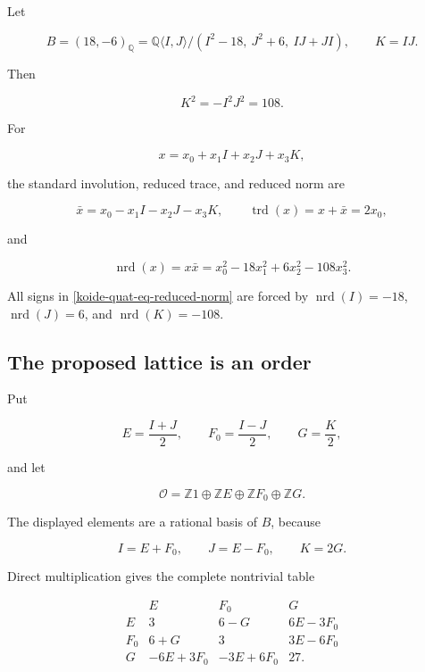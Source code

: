 Let

\[
 B=(18,-6)_{\mathbb Q}
 =\mathbb Q\langle I,J\rangle/
 (I^2-18,\ J^2+6,\ IJ+JI),
 \qquad K=IJ.
\]

Then

\[
 K^2=-I^2J^2=108.
\]

For

\[
 x=x_0+x_1I+x_2J+x_3K,
\]

the standard involution, reduced trace, and reduced norm are

\[
 \bar x=x_0-x_1I-x_2J-x_3K,
 \qquad \operatorname{trd}(x)=x+\bar x=2x_0,
\]

and

\begin{equation}\label{koide-quat-eq-reduced-norm}
 \operatorname{nrd}(x)=x\bar x
 =x_0^2-18x_1^2+6x_2^2-108x_3^2.
\end{equation}

All signs in \eqref{koide-quat-eq-reduced-norm} are forced by \(\operatorname{nrd}(I)=-18\), \(\operatorname{nrd}(J)=6\), and \(\operatorname{nrd}(K)=-108\).

\subsection{The proposed lattice is an order}\label{koide-quat-the-proposed-lattice-is-an-order}

Put

\[
 E=\frac{I+J}{2},\qquad
 F_0=\frac{I-J}{2},\qquad
 G=\frac K2,
\]

and let

\begin{equation}\label{koide-quat-eq-order-lattice}
 \mathcal O=\mathbb Z1\oplus\mathbb ZE
             \oplus\mathbb ZF_0\oplus\mathbb ZG.
\end{equation}

The displayed elements are a rational basis of \(B\), because

\[
 I=E+F_0,\qquad J=E-F_0,\qquad K=2G.
\]

Direct multiplication gives the complete nontrivial table

\begin{equation}\label{koide-quat-eq-multiplication-table}
\begin{array}{c|ccc}
   &E&F_0&G\\ \hline
 E&3&6-G&6E-3F_0\\
 F_0&6+G&3&3E-6F_0\\
 G&-6E+3F_0&-3E+6F_0&27.
\end{array}
\end{equation}

